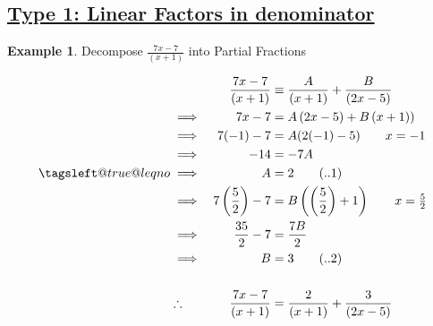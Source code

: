 \documentclass[12pt, a4paper]{report}
\makeatletter
\newcommand{\leqnomode}{\tagsleft@true\let\veqno\@@leqno}
\theoremstyle{definition}
\newtheorem{example}{Example}
\makeatother
\begin{document}
	\subsection*{\underline{Type 1: Linear Factors in denominator}}
	\begin{example}
		Decompose $ \frac{7x-7}{\left(x+1\right)}$ into Partial Fractions
	\end{example}
	\begin{alignat*}{2}	
		&            & \frac{7x-7}{\left(x+1\right)} & \equiv \frac{A}{\left(x+1\right)} + \frac{B}{\left(2x-5\right)} \\
		& \implies   & 7x-7                          & = A\left(2x-5\right)+B\left(x+1\right))                         \\	
		& \implies   & 7(-1)-7                       & = A(2(-1)-5)\tag*{$x = -1$}                                     \\
		& \implies   & -14                           & = -7A                                                           \\\leqnomode
		& \implies   & A                             & = 2\tag{..1}                                                    \\
		& \implies   & 7\left(\frac{5}{2}\right)-7   & =B\left(\left(\frac{5}{2}\right)+1\right)\tag*{$x=\frac{5}{2}$} \\
		& \implies   & \frac{35}{2} - 7              & = \frac{7B}{2}                                                  \\
		& \implies   & B                             & =3\tag{..2}                                                     \\\\
		& \therefore & \frac{7x-7}{\left(x+1\right)} & = \frac{2}{\left(x+1\right)} + \frac{3}{\left(2x-5\right)}      
	\end{alignat*}
	
	
\end{document}
